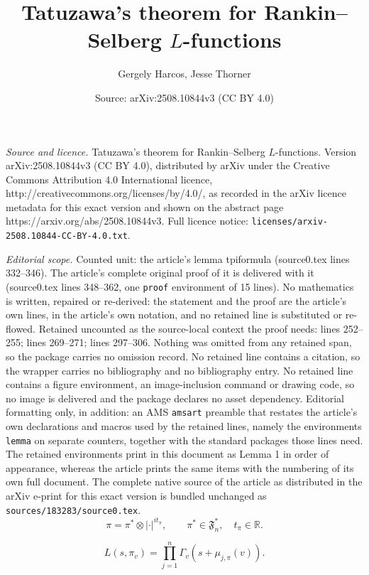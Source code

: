\documentclass[10pt,a4paper]{amsart}
\title{Tatuzawa's theorem for Rankin--Selberg $L$-functions}
\author{Gergely Harcos, Jesse Thorner}
\date{Source: arXiv:2508.10844v3 (CC BY 4.0)}
\newcommand{\R}{\mathbb{R}}
\begin{document}
\maketitle

\noindent\emph{Source and licence.} Tatuzawa's theorem for Rankin--Selberg $L$-functions. Version arXiv:2508.10844v3 (CC BY 4.0), distributed by arXiv under the Creative Commons Attribution 4.0 International licence, http://creativecommons.org/licenses/by/4.0/, as recorded in the arXiv licence metadata for this exact version and shown on the abstract page https://arxiv.org/abs/2508.10844v3. Full licence notice: \texttt{licenses/arxiv-2508.10844-CC-BY-4.0.txt}.\par\smallskip

\noindent\textit{Editorial scope.} Counted unit: the article's lemma tpiformula (source0.tex lines 332--346). The article's complete original proof of it is delivered with it (source0.tex lines 348--362, one \texttt{proof} environment of 15 lines). No mathematics is written, repaired or re-derived: the statement and the proof are the article's own lines, in the article's own notation, and no retained line is substituted or re-flowed.  Retained uncounted as the source-local context the proof needs: lines 252--255; lines 269--271; lines 297--306.  Nothing was omitted from any retained span, so the package carries no omission record.  No retained line contains a citation, so the wrapper carries no bibliography and no bibliography entry.  No retained line contains a figure environment, an image-inclusion command or drawing code, so no image is delivered and the package declares no asset dependency.  Editorial formatting only, in addition: an AMS \texttt{amsart} preamble that restates the article's own declarations and macros used by the retained lines, namely the environments \texttt{lemma} on separate counters, together with the standard packages those lines need.  The retained environments print in this document as Lemma 1 in order of appearance, whereas the article prints the same items with the numbering of its own full document.  The complete native source of the article as distributed in the arXiv e-print for this exact version is bundled unchanged as \texttt{sources/183283/source0.tex}.
\begin{equation}
\label{eqn:pidecomp}
\pi=\pi^*\otimes|\cdot|^{it_{\pi}},\qquad \pi^*\in\mathfrak{F}_n^*,\quad t_{\pi}\in\R.
\end{equation}

\begin{equation}\label{eq:Lpiv}
L(s,\pi_{v})=\prod_{j=1}^n \Gamma_v(s+\mu_{j,\pi}(v)).
\end{equation}
\end{document}
